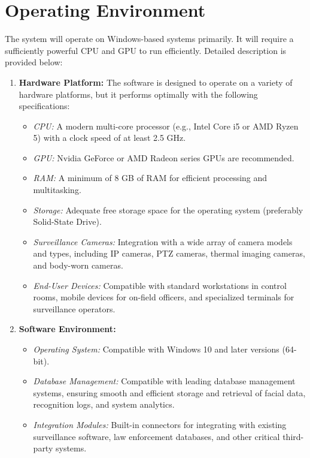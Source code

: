 \documentclass{scrreprt}
\begin{document}
    \section{Operating Environment}
        The system will operate on Windows-based systems primarily. It will require a sufficiently powerful CPU and GPU to run efficiently. Detailed description is provided below:
        \begin{enumerate}
            \item \textbf{Hardware Platform:}
                The software is designed to operate on a variety of hardware platforms, but it performs optimally with the following specifications:
                \begin{itemize}
                    \item \textit{CPU:} A modern multi-core processor (e.g., Intel Core i5 or AMD Ryzen 5) with a clock speed of at least 2.5 GHz.
                    \item \textit{GPU:} Nvidia GeForce or AMD Radeon series GPUs are recommended.
                    \item \textit{RAM:} A minimum of 8 GB of RAM for efficient processing and multitasking.
                    \item \textit{Storage:} Adequate free storage space for the operating system (preferably Solid-State Drive).
                    \item \textit{Surveillance Cameras:} Integration with a wide array of camera models and types, including IP cameras, PTZ cameras, thermal imaging cameras, and body-worn cameras.
                    \item \textit{End-User Devices:} Compatible with standard workstations in control rooms, mobile devices for on-field officers, and specialized terminals for surveillance operators.
                \end{itemize}
            \item \textbf{Software Environment:}
                \begin{itemize}
                    \item \textit{Operating System:} Compatible with Windows 10 and later versions (64-bit).
                    \item \textit{Database Management:} Compatible with leading database management systems, ensuring smooth and efficient storage and retrieval of facial data, recognition logs, and system analytics.
                    \item \textit{Integration Modules:} Built-in connectors for integrating with existing surveillance software, law enforcement databases, and other critical third-party systems.                    

\end{itemize}
\end{enumerate}
\end{document}
